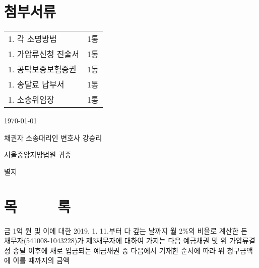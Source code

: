 \documentclass[12pt]{oblivoir}
\def\mysection#1{\hfil #1 \hfil} %
\begin{document}
\section*{\mysection{첨부서류}}
\vspace{2em}
\begin{tabu} to \linewidth{X X}
  1. 각 소명방법&1통\\
  1. 가압류신청 진술서&1통\\
  1. 공탁보증보험증권&1통\\
  1. 송달료 납부서&1통\\
  1. 소송위임장&1통
\end{tabu}
\par\vspace{5em}
\centering\today{}\par
\vspace{3em}
\raggedleft 채권자 소송대리인 변호사 강승리\\
\vspace{5em}
\raggedright 서울중앙지방법원 귀중
\par




\newpage
{} %
별지\\
\bigskip
\section*{\mysection{목~~~~~록}}
금 1억 원 및 이에 대한 2019. 1. 11.부터 다 갚는 날까지 월 2\%의 비율로 계산한 돈\\
\bigskip
채무자(541008-1043228)가 제3채무자에 대하여 가지는 다음 예금채권 및 위 가압류결정 송달 이후에 새로 입금되는 예금채권 중 다음에서 기재한 순서에 따라 위 청구금액에 이를 때까지의 금액
\bigskip
\end{document}

